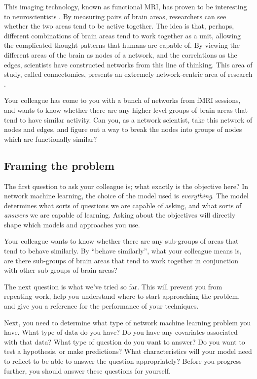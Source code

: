 This imaging technology, known as functional MRI, has proven to be interesting to neuroscientists \cite{Poldrack2011Aug}. By measuring pairs of brain areas, researchers can see whether the two areas tend to be active together. The idea is that, perhaps, different combinations of brain areas tend to work together as a unit, allowing the complicated thought patterns that humans are capable of. By viewing the different areas of the brain as nodes of a network, and the correlations as the edges, scientists have constructed networks from this line of thinking. This area of study, called connectomics, presents an extremely network-centric area of research \cite{Munsell2018Sep}.

Your colleague has come to you with a bunch of networks from fMRI sessions, and wants to know whether there are any higher level groups of brain areas that tend to have similar activity. Can you, as a network scientist, take this network of nodes and edges, and figure out a way to break the nodes into groups of nodes which are functionally similar?

\subsection{Framing the problem}

The first question to ask your colleague is; what exactly is the objective here? In network machine learning, the choice of the model used is \emph{everything}. The model determines what sorts of questions we are capable of asking, and what sorts of \emph{answers} we are capable of learning. Asking about the objectives will directly shape which models and approaches you use.

Your colleague wants to know whether there are any sub-groups of areas that tend to behave similarly. By ``behave similarly'', what your colleague means is, are there sub-groups of brain areas that tend to work together in conjunction with other sub-groups of brain areas?

The next question is what we've tried so far. This will prevent you from repeating work, help you understand where to start approaching the problem, and give you a reference for the performance of your techniques. 

Next, you need to determine what type of network machine learning problem you have. What type of data do you have? Do you have any covariates associated with that data? What type of question do you want to answer? Do you want to test a hypothesis, or make predictions? What characteristics will your model need to reflect to be able to answer the question appropriately? Before you progress further, you should answer these questions for yourself. 

